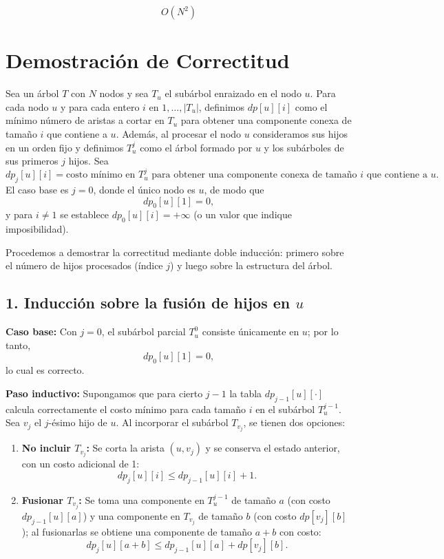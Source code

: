 \[
O(N^2)
\]

\section{Demostración de Correctitud}

Sea un árbol \(T\) con \(N\) nodos y sea \(T_u\) el subárbol enraizado en el nodo \(u\). Para cada nodo \(u\) y para cada entero \(i\) en \(1,\dots,|T_u|\), definimos $dp[u][i]$ como el mínimo número de aristas a cortar en  $T_u$ para obtener una componente conexa de tamaño $i$ que contiene a  $u$.
Además, al procesar el nodo \(u\) consideramos sus hijos en un orden fijo y definimos \(T_u^j\) como el árbol formado por \(u\) y los subárboles de sus primeros \(j\) hijos. Sea
\[
dp_j[u][i] = \text{costo mínimo en } T_u^j \text{ para obtener una componente conexa de tamaño } i \text{ que contiene a } u.
\]
El caso base es \(j=0\), donde el único nodo es \(u\), de modo que
\[
dp_0[u][1] = 0,
\]
y para \(i \neq 1\) se establece \(dp_0[u][i] = +\infty\) (o un valor que indique imposibilidad).

Procedemos a demostrar la correctitud mediante doble inducción: primero sobre el número de hijos procesados (índice \(j\)) y luego sobre la estructura del árbol.

\subsection*{1. Inducción sobre la fusión de hijos en \(u\)}

\textbf{Caso base:} Con \(j=0\), el subárbol parcial \(T_u^0\) consiste únicamente en \(u\); por lo tanto,
\[
dp_0[u][1] = 0,
\]
lo cual es correcto.

\textbf{Paso inductivo:}  
Supongamos que para cierto \(j-1\) la tabla \(dp_{j-1}[u][\cdot]\) calcula correctamente el costo mínimo para cada tamaño \(i\) en el subárbol \(T_u^{j-1}\). Sea \(v_j\) el \(j\)-ésimo hijo de \(u\). Al incorporar el subárbol \(T_{v_j}\), se tienen dos opciones:
\begin{enumerate}
    \item \textbf{No incluir \(T_{v_j}\):}  
    Se corta la arista \((u,v_j)\) y se conserva el estado anterior, con un costo adicional de 1:
    \[
    dp_j[u][i] \le dp_{j-1}[u][i] + 1.
    \]
    \item \textbf{Fusionar \(T_{v_j}\):}  
    Se toma una componente en \(T_u^{j-1}\) de tamaño \(a\) (con costo \(dp_{j-1}[u][a]\)) y una componente en \(T_{v_j}\) de tamaño \(b\) (con costo \(dp[v_j][b]\)); al fusionarlas se obtiene una componente de tamaño \(a+b\) con costo:
    \[
    dp_j[u][a+b] \le dp_{j-1}[u][a] + dp[v_j][b].
    \]
\end{enumerate}

